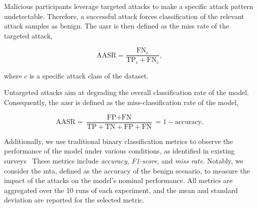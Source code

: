 \begin{description}[font=\normalfont\textit]
  \item[Targeted attacks:]
    Malicious participants leverage targeted attacks to make a specific attack pattern undetectable.
    Therefore, a successful attack forces classification of the relevant attack samples as benign.
    The \gls{aasr} is then defined as the miss rate of the targeted attack, \ie

    \begin{equation}
      \label{eq:aasr_targeted}
      \text{AASR} = \frac
        {\text{FN}_c}
        {\text{TP}_c + \text{FN}_c},
    \end{equation}

    where $c$ is a specific attack class of the dataset.

  \item[Untargeted Attacks:]
    Untargeted attacks aim at degrading the overall classification rate of the model.
    Consequently, the \gls{aasr} is defined as the miss-classification rate of the model, \ie

    \begin{equation}
      \label{eq:aasr_untargeted}
      \text{AASR} = \frac
        {\text{FP} + \text{FN}}
        {\text{TP} + \text{TN} + \text{FP} + \text{FN}}
        = 1 - \text{accuracy}.
    \end{equation}
\end{description}

Additionally, we use traditional binary classification metrics to observe the performance of the model under various conditions, as identified in existing surveys~\cite{campos_EvaluatingFederatedLearning_2022,lavaur_EvolutionFederatedLearningbased_2022}
These metrics include \emph{accuracy}, \emph{F1-score}, and \emph{miss rate}.
Notably, we consider the \gls{mta}, defined as the accuracy of the benign scenario, to measure the impact of the attacks on the model's nominal performance.
All metrics are aggregated over the 10 runs of each experiment, and the mean and standard deviation are reported for the selected metric.